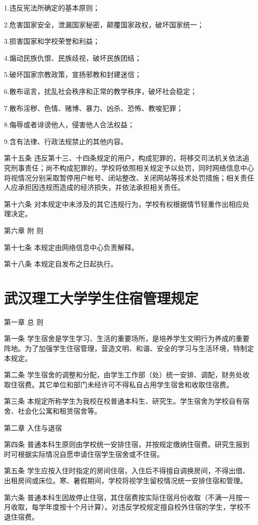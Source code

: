\documentclass[UTF8,12pt,a4paper]{report}
\begin{document}
1.违反宪法所确定的基本原则；

2.危害国家安全，泄漏国家秘密，颠覆国家政权，破坏国家统一；

3.损害国家和学校荣誉和利益；

4.煽动民族仇恨、民族歧视，破坏民族团结；

5.破坏国家宗教政策，宣扬邪教和封建迷信；

6.散布谣言，扰乱社会秩序和正常的教学秩序，破坏社会稳定；

7.散布淫秽、色情、赌博、暴力、凶杀、恐怖、教唆犯罪；

8.侮辱或者诽谤他人，侵害他人合法权益；

9.含有法律、行政法规禁止的其他内容。

第十五条 违反第十三、十四条规定的用户，构成犯罪的，将移交司法机关依法追究刑事责任；尚不构成犯罪的，学校将依照相关规定予以处罚，同时网络信息中心将视情况分别采取暂停用户帐号、闭站整改、关闭网站等技术处罚措施；相关责任人应承担因违规而造成的经济损失，并依法承担相关责任。

第十六条 对本规定中未涉及的其它违规行为，学校有权根据情节轻重作出相应处理决定。

第六章 附 则

第十七条 本规定由网络信息中心负责解释。

第十八条 本规定自发布之日起执行。
\chapter{武汉理工大学学生住宿管理规定}
第一章 总 则

第一条 学生宿舍是学生学习、生活的重要场所，是培养学生文明行为养成的重要阵地。为了加强学生住宿管理，营造文明、和谐、安全的学习与生活环境，特制定本规定。

第二条 学生宿舍的调整和分配，由学生工作部（处）统一安排、调配，财务处收取住宿费。其它单位和部门未经许可不得私自占用学生宿舍和收取住宿费。

第三条 本规定所称学生为我校在校普通本科生、研究生。学生宿舍为学校自有宿舍、社会化公寓和租赁宿舍等。

第二章 入住与退宿

第四条 普通本科生原则由学校统一安排住宿，并按规定缴纳住宿费。研究生报到时可根据实际情况自愿申请住宿学生宿舍或不住宿。

第五条 学生应按入住时指定的房间住宿，入住后不得擅自调换房间，不得出借、出租房间或床位。寒、暑假期间，学校将视学生留校情况统一安排住宿和管理。

第六条 普通本科生因故停止住宿，其住宿费按实际住宿月份收取（不满一月按一月收取，每学年度按十个月计算）。对违反学校规定擅自校外住宿的学生，学校不退住宿费。
\end{document}
